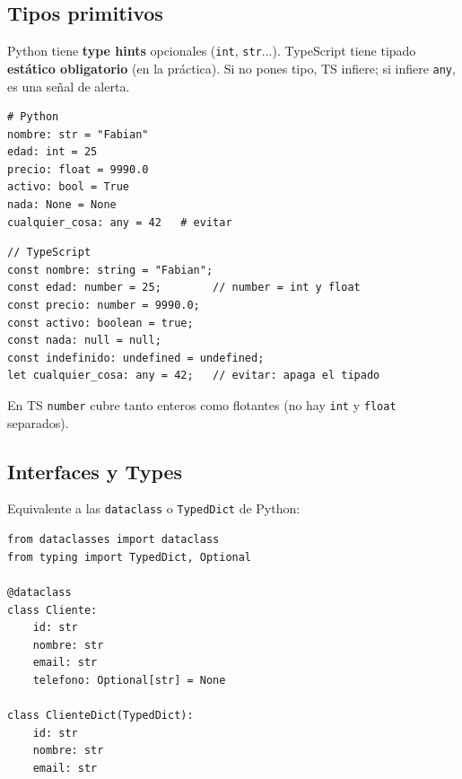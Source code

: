 \documentclass[11pt,a4paper]{article}
\begin{document}
\subsection{Tipos primitivos}

\begin{tcolorbox}[colback=gray!5,colframe=gray,title=La idea clave]
Python tiene \textbf{type hints} opcionales (\texttt{int}, \texttt{str}...). TypeScript tiene tipado \textbf{estático obligatorio}
(en la práctica). Si no pones tipo, TS infiere; si infiere \texttt{any}, es una señal de alerta.
\end{tcolorbox}

\begin{pybox}
\begin{lstlisting}[style=python]
# Python
nombre: str = "Fabian"
edad: int = 25
precio: float = 9990.0
activo: bool = True
nada: None = None
cualquier_cosa: any = 42   # evitar
\end{lstlisting}
\end{pybox}

\begin{tsbox}
\begin{lstlisting}[style=typescript]
// TypeScript
const nombre: string = "Fabian";
const edad: number = 25;        // number = int y float
const precio: number = 9990.0;
const activo: boolean = true;
const nada: null = null;
const indefinido: undefined = undefined;
let cualquier_cosa: any = 42;   // evitar: apaga el tipado
\end{lstlisting}
\end{tsbox}

\begin{alertbox}
En TS \texttt{number} cubre tanto enteros como flotantes (no hay \texttt{int} y \texttt{float} separados).
\end{alertbox}

\subsection{Interfaces y Types}

Equivalente a las \texttt{dataclass} o \texttt{TypedDict} de Python:

\begin{pybox}
\begin{lstlisting}[style=python]
from dataclasses import dataclass
from typing import TypedDict, Optional

@dataclass
class Cliente:
    id: str
    nombre: str
    email: str
    telefono: Optional[str] = None

class ClienteDict(TypedDict):
    id: str
    nombre: str
    email: str
\end{lstlisting}
\end{pybox}
\end{document}
